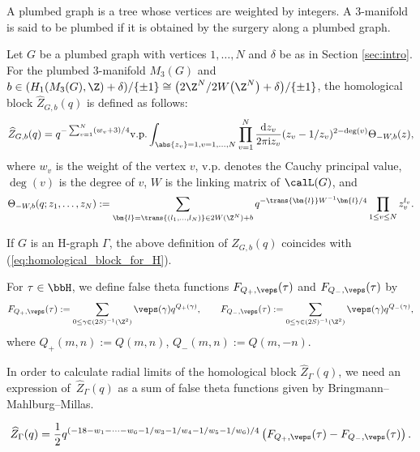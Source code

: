 A plumbed graph is a tree whose vertices are weighted by integers.
A 3-manifold is said to be plumbed if it is obtained by the surgery along a plumbed graph.
\begin{dfn}
	Let $G$ be a plumbed graph with vertices $1, \dots, N$ and $\delta$ be as in Section \ref{sec:intro}.
	For the plumbed $ 3 $-manifold $M_{3}(G)$ and $ b \in ( H_1(M_3(G), \Z) + \delta)/ \{ \pm1 \} \cong \big(2\Z^{N} / 2W\big(\Z^{N}\big) + \delta\big) / \{ \pm1 \} $, the homological block $\widehat{Z}_{G, b} (q)$ is defined as follows:
	\begin{gather*}
	\widehat{Z}_{G, b} (q)
	=
	q^{-\sum_{v = 1}^{N} (w_{v} + 3)/4}
	\mathrm{v.p.} \int_{\abs{z_{v}}=1, v =1, \dots, N} \prod_{v = 1}^{N} \frac{{\rm d}z_{v}}{2\pi {\rm i} z_{v}} (z_{v} - 1/z_{v})^{2 - \deg(v)}
	\Theta_{-W, b}(z),
	\end{gather*}
	where $w_{v}$ is the weight of the vertex $v$, $ \mathrm{v.p.} $ denotes the Cauchy principal value, $\deg(v)$ is the degree of $v$, $W$ is the linking matrix of $\calL(G)$, and
	\begin{gather*}
	\Theta_{-W, b} (q; z_1, \dots, z_N) :=
	\sum_{\bm{l} = \trans{(l_1, \dots, l_N)} \in 2W (\Z^N) + b} q^{-\trans{\bm{l}} W^{-1} \bm{l}/4} \prod_{1 \le v \le N} z_v^{l_v}.
	\end{gather*}
\end{dfn}

If $ G $ is an H-graph $ \Gamma $, the above definition of $ \widehat{Z}_{G, b} (q) $ coincides with (\ref{eq:homological_block_for_H}).
\begin{dfn} %
	For $ \tau \in \bbH$, we define false theta functions $F_{Q_{+}, \veps}(\tau)$ and $F_{Q_{-}, \veps}(\tau)$ by
	\begin{gather*}
	F_{Q_{+}, \veps}(\tau) := \sum_{0 \le \gamma \in (2S)^{-1} (\Z^2)} \veps(\gamma) q^{Q_+(\gamma)}, \qquad
	F_{Q_{-}, \veps}(\tau) := \sum_{0 \le \gamma \in (2S)^{-1} (\Z^2)} \veps(\gamma) q^{Q_-(\gamma)},
	\end{gather*}
	where $ Q_+(m, n) := Q(m, n)$, $Q_-(m, n) := Q(m, -n) $.
\end{dfn}

In order to calculate radial limits of the homological block $\widehat{Z}_\Gamma (q)$, we need an expression of~$\widehat{Z}_\Gamma (q)$ as a sum of false theta functions given by Bringmann--Mahlburg--Millas.

\begin{prop} %
	\begin{gather*}
	\widehat{Z}_\Gamma (q) = \frac{1}{2} q^{(-18 - w_1 - \cdots - w_6 - 1/w_3 - 1/w_4 - 1/w_5 - 1/w_6)/4}
	\left( F_{Q_{+}, \veps}(\tau) - F_{Q_{-}, \veps}(\tau) \right).
	\end{gather*}
\end{prop}


